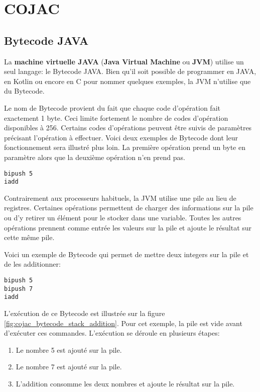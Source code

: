 
\chapter{COJAC}

\section{Bytecode JAVA}

La \textbf{machine virtuelle JAVA} (\textbf{Java Virtual Machine} ou \textbf{JVM}) utilise un seul langage: le Bytecode JAVA. Bien qu'il soit possible de programmer en JAVA, en Kotlin ou encore en C pour nommer quelques exemples, la JVM n'utilise que du Bytecode.

Le nom de Bytecode provient du fait que chaque code d'opération fait exactement 1 byte. Ceci limite fortement le nombre de codes d'opération disponibles à 256. Certains codes d'opérations peuvent être suivis de paramètres précisant l'opération à effectuer. Voici deux exemples de Bytecode dont leur fonctionnement sera illustré plus loin. La première opération prend un byte en paramètre alors que la deuxième opération n'en prend pas.
\begin{verbatim}
bipush 5
iadd
\end{verbatim}

Contrairement aux processeurs habituels, la JVM utilise une pile au lieu de registres. Certaines opérations permettent de charger des informations sur la pile ou d'y retirer un élément pour le stocker dans une variable. Toutes les autres opérations prennent comme entrée les valeurs sur la pile et ajoute le résultat sur cette même pile.

Voici un exemple de Bytecode qui permet de mettre deux integers sur la pile et de les additionner:
\begin{verbatim}
bipush 5
bipush 7
iadd
\end{verbatim}

L'exécution de ce Bytecode est illustrée sur la figure \ref{fig:cojac_bytecode_stack_addition}. Pour cet exemple, la pile est vide avant d'exécuter ces commandes. L'exécution se déroule en plusieurs étapes:
\begin{enumerate}
    \item Le nombre 5 est ajouté sur la pile.
    \item Le nombre 7 est ajouté sur la pile.
    \item L'addition consomme les deux nombres et ajoute le résultat sur la pile.
\end{enumerate}

